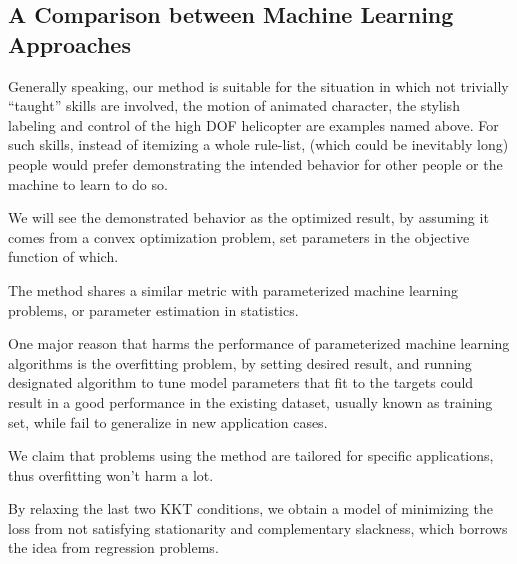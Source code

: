 \subsection{A Comparison between Machine Learning Approaches}
Generally speaking, our method is suitable for the situation in which not trivially ``taught'' skills are involved, the motion of animated character, the stylish labeling and control of the high DOF helicopter are examples named above.
For such skills, instead of itemizing a whole rule-list, (which could be inevitably long) people would prefer demonstrating the intended behavior for other people or the machine to learn to do so.

We will see the demonstrated behavior as the optimized result, by assuming it comes from a convex optimization problem, set parameters in the objective function of which.

The method shares a similar metric with parameterized machine learning problems, or parameter estimation in statistics.

One major reason that harms the performance of parameterized machine learning algorithms is the overfitting problem, by setting desired result, and running designated algorithm to tune model parameters that fit to the targets could result in a good performance in the existing dataset, usually known as training set, while fail to generalize in new application cases.

We claim that problems using the method are tailored for specific applications, thus overfitting won't harm a lot.

By relaxing the last two KKT conditions, we obtain a model of minimizing the loss from not satisfying stationarity and complementary slackness, which borrows the idea from regression problems.
